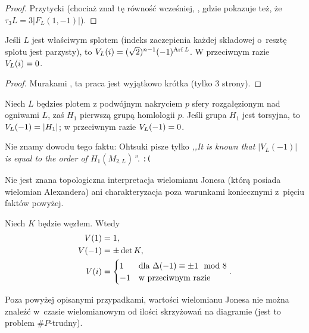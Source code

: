 \begin{proof}
%
    Przytycki \cite{przytycki1998} (chociaż znał tę równość wcześniej, \cite[s. 200]{przytycki1995}, gdzie pokazuje też, że $\tau_3 L = 3 |F_L(1, -1)|$).
\end{proof}

\begin{proposition}
    Jeśli $L$ jest właściwym splotem (indeks zaczepienia każdej składowej o~resztę splotu jest parzysty), to $V_L(i) = (\sqrt 2)^{n-1}(-1)^{\operatorname{Arf} L}$.
    W przeciwnym razie $V_L(i) = 0$.
\end{proposition}

\begin{proof}
%
    Murakami \cite{murakami1986}, ta praca jest wyjątkowo krótka (tylko 3 strony).
\end{proof}

\begin{proposition}
    Niech $L$ będzies plotem z podwójnym nakryciem $p$ sfery rozgałęzionym nad ogniwami $L$, zaś $H_1$ pierwszą grupą homlologii $p$.
    Jeśli grupa $H_1$ jest torsyjna, to $V_L(-1) = |H_1|$; w przeciwnym razie $V_L(-1) = 0$.
\end{proposition}

Nie znamy dowodu tego faktu: Ohtsuki \cite[s. 383]{ohtsuki2002} pisze tylko \emph{,,It is known that $|V_L(-1)|$ is equal to the order of $H_1(M_{2,L})$''}. \hfill \texttt{:(}


Nie jest znana topologiczna interpretacja wielomianu Jonesa (którą posiada wielomian Alexandera) ani charakteryzacja poza warunkami koniecznymi z~pięciu faktów powyżej.

\begin{corollary}
    Niech $K$ będzie węzłem.
    Wtedy
    \begin{align}
        V(1) & = 1, \\
        V(-1) & = \pm \det K, \\
        V(i) & = \begin{cases}
            1 & \text{dla } \Delta(-1) \equiv \pm 1 \mod 8 \\
            -1 & \text{w przeciwnym razie}
        \end{cases}.
    \end{align}
\end{corollary}

Poza powyżej opisanymi przypadkami, wartości wielomianu Jonesa nie można znaleźć w~czasie wielomianowym od ilości skrzyżowań na diagramie (jest to problem $\#P$-trudny).




